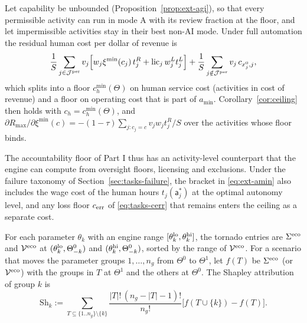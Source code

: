 \begin{corollary}\label{cor:ext-floor}
Let capability be unbounded (Proposition~\ref{prop:ext-agi}), so that every permissible activity can run in mode A with its review fraction at the floor, and let impermissible activities stay in their best non-AI mode. Under full automation the residual human cost per dollar of revenue is
\begin{equation}\label{eq:ext-amin}
\frac1S\sum_{j\in\mathcal J^{\rm per}}v_j\Bigl[w_j\xi^{\min}(c_j)\,t^R_j+\mathrm{lic}_j\,w^L_jt^L_j\Bigr]+\frac1S\sum_{j\notin\mathcal J^{\rm per}}v_j\,c_{x^0_j,j},
\end{equation}
which splits into a floor $c_h^{\min}(\Theta)$ on human service cost (activities in cost of revenue) and a floor on operating cost that is part of $a_{\min}$. Corollary~\ref{cor:ceiling} then holds with $c_h=c_h^{\min}(\Theta)$, and $\partial R_{\max}/\partial\xi^{\min}(c)=-(1-\tau)\sum_{j:c_j=c}v_jw_jt^R_j/S$ over the activities whose floor binds.
\end{corollary}

The accountability floor of Part I thus has an activity-level counterpart that the engine can compute from oversight floors, licensing and exclusions. Under the failure taxonomy of Section~\ref{sec:tasks-failure}, the bracket in \eqref{eq:ext-amin} also includes the wage cost of the human hours $t_j(\mathsf a^*_j)$ at the optimal autonomy level, and any loss floor $c_{\rm err}$ of \eqref{eq:tasks-cerr} that remains enters the ceiling as a separate cost.

\begin{definition}\label{def:ext-tornado}
For each parameter $\theta_k$ with an engine range $[\theta_k^{\rm lo},\theta_k^{\rm hi}]$, the tornado entries are $\Sigma^{\rm eco}$ and $\mathcal V^{\rm eco}$ at $(\theta_k^{\rm lo},\Theta^0_{-k})$ and $(\theta_k^{\rm hi},\Theta^0_{-k})$, sorted by the range of $\mathcal V^{\rm eco}$. For a scenario that moves the parameter groups $1,\dots,n_g$ from $\Theta^0$ to $\Theta^1$, let $f(T)$ be $\Sigma^{\rm eco}$ (or $\mathcal V^{\rm eco}$) with the groups in $T$ at $\Theta^1$ and the others at $\Theta^0$. The Shapley attribution of group $k$ is
\begin{equation}\label{eq:ext-shapley}
\mathrm{Sh}_k:=\sum_{T\subseteq\{1..n_g\}\setminus\{k\}}\frac{|T|!\,(n_g-|T|-1)!}{n_g!}\bigl[f(T\cup\{k\})-f(T)\bigr].
\end{equation}
\end{definition}

